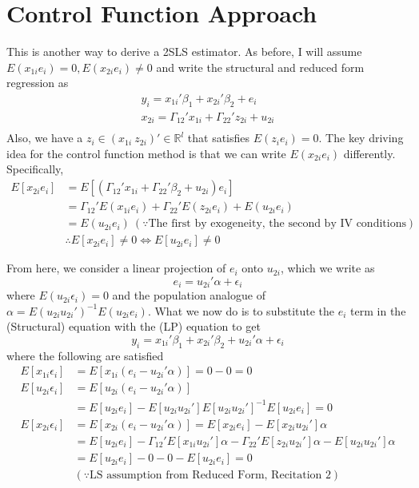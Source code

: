 \section{Control Function Approach}
This is another way to derive a 2SLS estimator. As before, I will assume $E(x_{1i}e_i)=0, E(x_{2i}e_i)\neq0$ and write the structural and reduced form regression as
\begin{gather*}
y_i = x_{1i}'\beta_1 + x_{2i}'\beta_2+e_i \tag{Structural}\\
x_{2i}=\Gamma_{12}'x_{1i}+\Gamma_{22}'z_{2i}+u_{2i} \tag{Reduced Form}\\
\end{gather*}
Also, we have a $z_i\in( x_{1i}\  z_{2i})'\in\mathbb{R}^l$ that satisfies $E(z_ie_i)=0$. The key driving idea for the control function method is that we can write $E(x_{2i}e_i)$ differently. Specifically, 
\[
\begin{aligned}
E[x_{2i}e_i]&= E[(\Gamma_{12}'x_{1i}+\Gamma_{22}'\beta_2+u_{2i})e_i]\\
&= \Gamma_{12}'E(x_{1i}e_i)+\Gamma_{22}'E(z_{2i}e_i)+E(u_{2i}e_i)\\
&= E(u_{2i}e_i) \ (\because \text{The first by exogeneity, the second by IV conditions})\\
&\therefore E[x_{2i}e_i]\neq 0 \iff E[u_{2i}e_i]\neq 0 
\end{aligned}
\]\par
From here, we consider a linear projection of $e_i$ onto $u_{2i}$, which we write as
\[
e_i  = u_{2i}'\alpha+\epsilon_i \tag{LP}
\]
where $E(u_{2i}\epsilon_i)=0$ and the population analogue of $\alpha=E(u_{2i}u_{2i}')^{-1}E(u_{2i}e_i)$. What we now do is to substitute the $e_i$ term in the (Structural) equation with the (LP) equation to get
\[
y_i = x_{1i}'\beta_1 + x_{2i}'\beta_2+ u_{2i}'\alpha+\epsilon_i   \tag{CFA}
\]
where the following are satisfied
\[
\begin{aligned}
E[x_{1i}\epsilon_i]&=E[x_{1i}(e_i-u_{2i}'\alpha)]=0-0=0 \\
E[u_{2i}\epsilon_i]&=E[u_{2i}(e_i-u_{2i}'\alpha)]\\
&=E[u_{2i}e_i]-E[u_{2i}u_{2i}']E[u_{2i}u_{2i}']^{-1}E[u_{2i}e_i]=0 \\
E[x_{2i}\epsilon_i]&=E[x_{2i}(e_i-u_{2i}'\alpha)]=E[x_{2i}e_i]-E[x_{2i}u_{2i}']\alpha \\
&=E[u_{2i}e_i]-\Gamma_{12}'E[x_{1i}u_{2i}']\alpha-\Gamma_{22}'E[z_{2i}u_{2i}']\alpha-E[u_{2i}u_{2i}']\alpha\\
&=E[u_{2i}e_i]-0-0-E[u_{2i}e_i]=0 \\
&(\because\text{LS assumption from Reduced Form, Recitation 2})\\
\end{aligned}
\]
